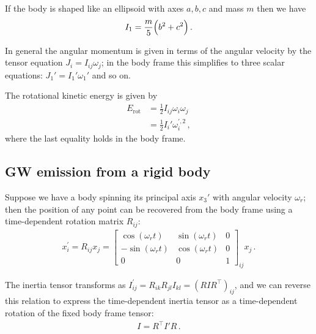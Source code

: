 \documentclass[main.tex]{subfiles}
\begin{document}
If the body is shaped like an ellipsoid with axes \(a, b, c\) and mass \(m\) then we have 
%
\begin{align}
I_1 = \frac{m}{5} \qty(b^2 +c^2)
\,.
\end{align}

In general the angular momentum is given in terms of the angular velocity by the tensor equation \(J_{i} = I_{ij} \omega_{j} \); in the body frame this simplifies to three scalar equations: \(J_1' = I_1' \omega_1' \) and so on.

The rotational kinetic energy is given by 
%
\begin{subequations}
\begin{align}
E _{\text{rot}} &= \frac{1}{2} I_{ij} \omega_{i} \omega_{j} \\ 
&= \frac{1}{2} I_i' \omega_{i}^{\prime, 2}
\,,
\end{align}
\end{subequations}
%
where the last equality holds in the body frame. 

\subsection{GW emission from a rigid body}

Suppose we have a body spinning its principal axis \(x_3'\) with angular velocity \(\omega_{r}\); then the position of any point can be recovered from the body frame using a time-dependent rotation matrix \(R_{ij}\): 
%
\begin{align}
x^{\prime }_{i} = R_{ij} x_{j} =
\left[\begin{array}{ccc}
\cos(\omega_{r}t) & \sin(\omega_{r}t) & 0 \\ 
- \sin(\omega_{r} t) & \cos(\omega_{r}t) & 0 \\ 
0 & 0 & 1
\end{array}\right]_{ij} x_{j}
\,.
\end{align}

The inertia tensor transforms as \(I^{\prime }_{ij} = R_{ik} R_{jl} I_{kl} = (R I R^{\top})_{ij}\), and we can reverse this relation to express the time-dependent inertia tensor as a time-dependent rotation of the fixed body frame tensor:
%
\begin{align}
I = R^{\top} I' R
\,.
\end{align}
\end{document}
